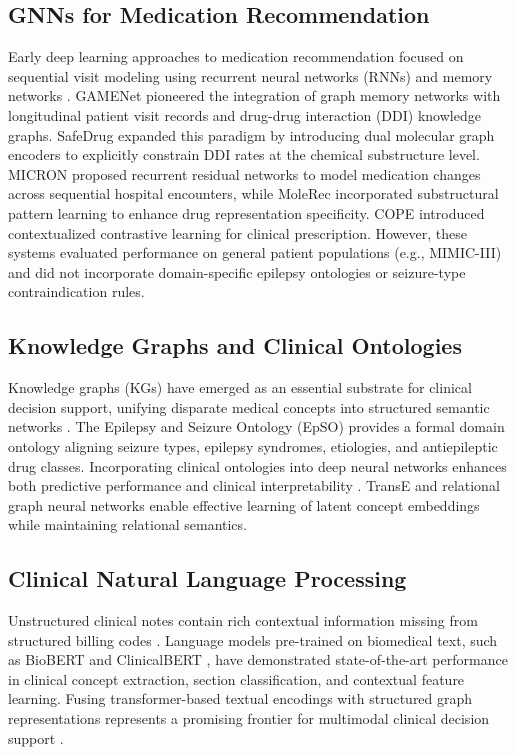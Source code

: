 \documentclass[11pt,a4paper]{article}
\begin{document}
\subsection{GNNs for Medication Recommendation}
Early deep learning approaches to medication recommendation focused on sequential visit modeling using recurrent neural networks (RNNs) and memory networks \cite{le2018dual}. GAMENet \cite{shang2019gamenet} pioneered the integration of graph memory networks with longitudinal patient visit records and drug-drug interaction (DDI) knowledge graphs. SafeDrug \cite{yang2021safedrug} expanded this paradigm by introducing dual molecular graph encoders to explicitly constrain DDI rates at the chemical substructure level. MICRON \cite{yang2021micron} proposed recurrent residual networks to model medication changes across sequential hospital encounters, while MoleRec \cite{yang2023molerec} incorporated substructural pattern learning to enhance drug representation specificity. COPE \cite{zhang2023cope} introduced contextualized contrastive learning for clinical prescription. However, these systems evaluated performance on general patient populations (e.g., MIMIC-III) and did not incorporate domain-specific epilepsy ontologies or seizure-type contraindication rules.

\subsection{Knowledge Graphs and Clinical Ontologies}
Knowledge graphs (KGs) have emerged as an essential substrate for clinical decision support, unifying disparate medical concepts into structured semantic networks \cite{rotmensch2017learning}. The Epilepsy and Seizure Ontology (EpSO) \cite{sahoo2014epso} provides a formal domain ontology aligning seizure types, epilepsy syndromes, etiologies, and antiepileptic drug classes. Incorporating clinical ontologies into deep neural networks enhances both predictive performance and clinical interpretability \cite{choi2017gram, ji2021survey}. TransE \cite{bordes2013translating} and relational graph neural networks \cite{schlichtkrull2018modeling} enable effective learning of latent concept embeddings while maintaining relational semantics.

\subsection{Clinical Natural Language Processing}
Unstructured clinical notes contain rich contextual information missing from structured billing codes \cite{wang2018clinical}. Language models pre-trained on biomedical text, such as BioBERT \cite{lee2020biobert} and ClinicalBERT \cite{alsentzer2019publicly}, have demonstrated state-of-the-art performance in clinical concept extraction, section classification, and contextual feature learning. Fusing transformer-based textual encodings with structured graph representations represents a promising frontier for multimodal clinical decision support \cite{khaledi2023multimodal}.
\end{document}
